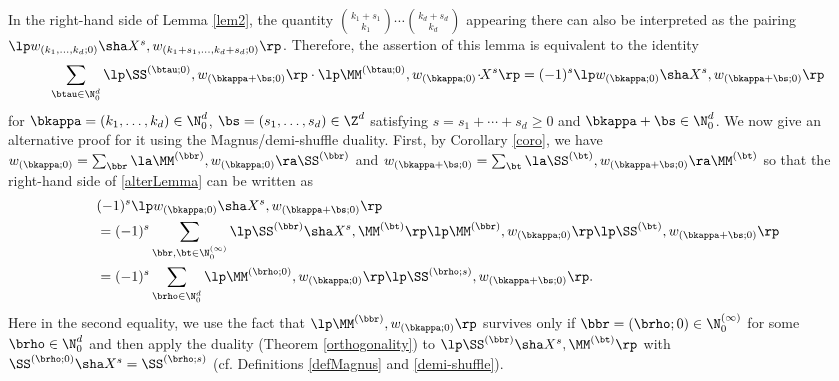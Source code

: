\begin{Note} \label{Quest4.3}
In the right-hand side of Lemma \ref{lem2}, the quantity
$\binom{k_1+s_1}{k_1}\cdots \binom{k_d+s_d}{k_d}$ appearing there can also be interpreted as
the pairing
$\lp w_{(k_1,\dots,k_d;0)}\sha X^s, w_{(k_1+s_1,\dots,k_d+s_d;0)} \rp$.
Therefore, the assertion of this lemma is equivalent to the identity
\begin{equation}
\sum_{\btau\in\N_0^d} 
\lp\SS^{(\btau;0)},w_{(\bkappa+\bs;0)} \rp \cdot \lp\MM^{(\btau;0)}, w_{(\bkappa;0)}\!\cdot\!\! X^s\rp
=(-1)^s 
\lp w_{(\bkappa;0)}\sha X^s, w_{(\bkappa+\bs;0)} \rp
\label{alterLemma}
\end{equation}
for $\bkappa=(k_1,\dots,k_d)\in\N_0^d$, $\bs=(s_1,\dots,s_d)\in\Z^d$ 
satisfying $s=s_1+\cdots+s_d\ge 0$ and $\bkappa+\bs\in\N_0^d$.
We now give an alternative proof for it using the Magnus/demi-shuffle duality.
First, by Corollary \ref{coro}, we have 
$w_{(\bkappa;0)}=\sum_\bbr\la \MM^{(\bbr)},w_{(\bkappa;0)}\ra \SS^{(\bbr)}$ 
and $w_{(\bkappa+\bs;0)}=\sum_\bt\la \SS^{(\bt)},w_{(\bkappa+\bs;0)}\ra \MM^{(\bt)}$
so that the right-hand side of \eqref{alterLemma} can be written as
\begin{align}
\label{RHS4.2}
&(-1)^s 
\lp w_{(\bkappa;0)}\sha X^s, w_{(\bkappa+\bs;0)} \rp \\
&=(-1)^s \sum_{\bbr,\bt\in\N_0^{(\infty)}}
\lp \SS^{(\bbr)}\sha X^s, \MM^{(\bt)} \rp
\lp \MM^{(\bbr)} ,w_{(\bkappa;0)} \rp
\lp \SS^{(\bt)} ,w_{(\bkappa+\bs;0)}\rp
\notag \\
&=(-1)^s \sum_{\brho\in\N_0^d} 
\lp \MM^{(\brho;0)} ,w_{(\bkappa;0)}\rp
\lp  \SS^{(\brho;s)}, w_{(\bkappa+\bs;0)} \rp.
\notag
\end{align}
Here in the second equality, we use the fact that
$\lp  \MM^{(\bbr)}, w_{(\bkappa;0)} \rp$ 
survives only if $\bbr=(\brho;0)\in\N_0^{(\infty)}$ for some $\brho\in\N_0^d$
and then apply the duality (Theorem \ref{orthogonality})
to $\lp \SS^{(\bbr)}\sha X^s, \MM^{(\bt)} \rp$
with $\SS^{(\brho;0)}\sha X^s=\SS^{(\brho;s)}$ 
(cf. Definitions \ref{defMagnus} and \ref{demi-shuffle}).


\end{Note}
